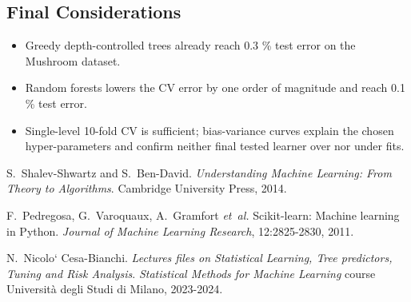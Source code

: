 \documentclass[12pt]{report}
\begin{document}
\subsection{Final Considerations}

\begin{itemize}
  \item Greedy depth-controlled trees already reach 0.3 \% test error on the Mushroom dataset.
  \item Random forests lowers the CV error by one order of magnitude and reach 0.1 \% test error.
  \item Single-level 10-fold CV is sufficient; bias-variance curves explain the chosen 
        hyper-parameters and confirm neither final tested learner over nor under fits.
\end{itemize}

\begingroup
\setlength{\bibsep}{1pt}
\begin{thebibliography}{9}

S.~Shalev-Shwartz and S.~Ben-David.
\newblock \emph{Understanding Machine Learning: From Theory to Algorithms}.
\newblock Cambridge University Press, 2014.

F.~Pedregosa, G.~Varoquaux, A.~Gramfort \emph{et~al.}
\newblock Scikit-learn: Machine learning in {P}ython.
\newblock \emph{Journal of Machine Learning Research}, 12:2825-2830, 2011.

N.~Nicolo` Cesa-Bianchi.
\newblock \emph{Lectures files on Statistical Learning, Tree predictors, Tuning and
Risk Analysis}. 
\newblock \emph{Statistical Methods for Machine Learning} course Università degli
Studi di Milano, 2023-2024.

\end{thebibliography}
\endgroup
\end{document}
